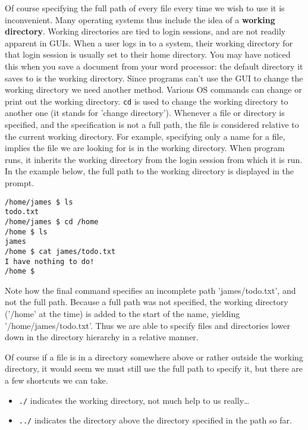 \documentclass[a4paper,11pt]{article}
\begin{document}
Of course specifying the full path of every file every time we wish   to use it is inconvenient. Many operating systems thus include the idea   of a \textbf{working directory}. Working directories are tied   to login sessions, and are not readily apparent in GUIs. When a user   logs in to a system, their working directory for that login session is   usually set to their home directory. You may have noticed this when you save a document from your word processor: the default directory it saves to is the working directory. Since programs can't use the GUI to change the working directory we need another method. Various OS commands can change or   print out the working directory. 
\texttt{cd} is used to change the   working directory to another one (it stands for 'change directory').  Whenever a file or directory is   specified, and the specification is not a full path, the file is   considered relative to the current working directory. For example,   specifying only a name for a file, implies the file we are looking for   is in the working directory. When program runs, it inherits the working   directory from the login session from which it is run. In the example   below, the full path to the working directory is displayed in the   prompt.
\begin{lstlisting}
/home/james $ ls
todo.txt
/home/james $ cd /home
/home $ ls
james
/home $ cat james/todo.txt
I have nothing to do!
/home $ \end{lstlisting}

Note how the final command specifies an incomplete path   'james/todo.txt', and not the full path. Because a full path was not   specified, the working directory ('/home' at the time) is added to the start of   the name, yielding '/home/james/todo.txt'. Thus we are able to specify   files and directories lower down in the directory hierarchy in a   relative manner.

Of course if a file is in a directory somewhere above or rather   outside the working directory, it would seem we must still use the full   path to specify it, but there are a few shortcuts we can take.
\begin{itemize}
	\item 
\texttt{./} indicates the working directory, not much help to us really\ldots
	\item 
\texttt{../} indicates the directory above the directory specified in the path so far.
\end{itemize}
\end{document}
